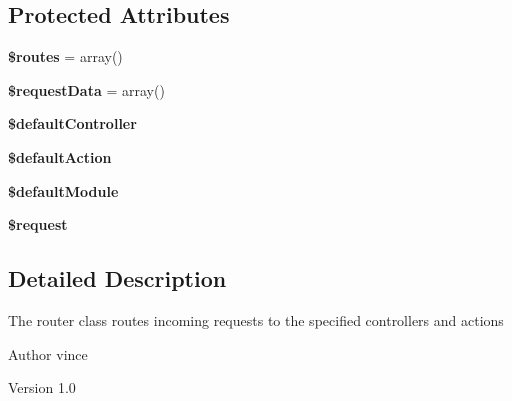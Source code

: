 \subsection*{Protected Attributes}
\begin{DoxyCompactItemize}
\item 
\hypertarget{class_anemo_1_1_router_a8f7eb04a54e0f0bfc0cedeb9899ce4a8}{
{\bfseries \$routes} = array()}
\label{class_anemo_1_1_router_a8f7eb04a54e0f0bfc0cedeb9899ce4a8}

\item 
\hypertarget{class_anemo_1_1_router_a40b79113bfcd261aa03d02c836b4fd0d}{
{\bfseries \$requestData} = array()}
\label{class_anemo_1_1_router_a40b79113bfcd261aa03d02c836b4fd0d}

\item 
\hypertarget{class_anemo_1_1_router_a3fcaeb229c94173ba904952898e7bfed}{
{\bfseries \$defaultController}}
\label{class_anemo_1_1_router_a3fcaeb229c94173ba904952898e7bfed}

\item 
\hypertarget{class_anemo_1_1_router_ab8b5213f191f4e05bec89f1841a35c16}{
{\bfseries \$defaultAction}}
\label{class_anemo_1_1_router_ab8b5213f191f4e05bec89f1841a35c16}

\item 
\hypertarget{class_anemo_1_1_router_a78e75cfa2a7b1db0c89be5c7da2f2173}{
{\bfseries \$defaultModule}}
\label{class_anemo_1_1_router_a78e75cfa2a7b1db0c89be5c7da2f2173}

\item 
\hypertarget{class_anemo_1_1_router_abb35c8495a232b510389fa6d7b15d38a}{
{\bfseries \$request}}
\label{class_anemo_1_1_router_abb35c8495a232b510389fa6d7b15d38a}

\end{DoxyCompactItemize}


\subsection{Detailed Description}
The router class routes incoming requests to the specified controllers and actions \begin{DoxyAuthor}{Author}
vince 
\end{DoxyAuthor}
\begin{DoxyVersion}{Version}
1.0 
\end{DoxyVersion}


